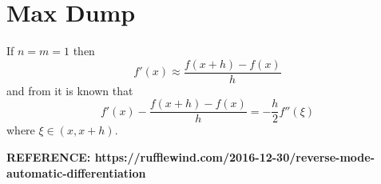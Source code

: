 \documentclass{article}
\begin{document}
\section{Max Dump}

If $n=m=1$ then
\begin{equation*}
    f'(x) \approx \frac{f(x+h)-f(x)}{h}
\end{equation*}
and from \cite{quarteroni} it is known that
\begin{equation*}
    f'(x) - \frac{f(x+h)-f(x)}{h} = - \frac{h}{2} f''(\xi)
\end{equation*}
where $\xi \in (x, x+h)$.

\textbf{REFERENCE: https://rufflewind.com/2016-12-30/reverse-mode-automatic-differentiation}
\end{document}
